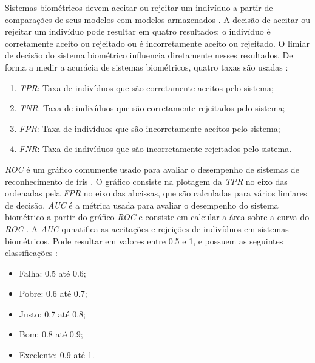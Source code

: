 \par Sistemas biométricos devem aceitar ou rejeitar um indivíduo a partir de comparações de seus modelos com modelos armazenados \cite{wayman2005biometric}. A decisão de aceitar ou rejeitar um indivíduo pode resultar em quatro resultados: o indivíduo é corretamente aceito ou rejeitado ou é incorretamente aceito ou rejeitado. O limiar de decisão do sistema biométrico influencia diretamente nesses resultados. De forma a medir a acurácia de sistemas biométricos, quatro taxas são usadas \cite{daugman2000}:

\begin{enumerate}
    \item \textit{\acrfull{TPR}}: Taxa de indivíduos que são corretamente aceitos pelo sistema;
    \item \textit{\acrfull{TNR}}: Taxa de indivíduos que são corretamente rejeitados pelo sistema;
    \item \textit{\acrfull{FPR}}: Taxa de indivíduos que são incorretamente aceitos pelo sistema;
    \item \textit{\acrfull{FNR}}: Taxa de indivíduos que são incorretamente rejeitados pelo sistema.
\end{enumerate}

\par \textit{\acrshort{ROC}} é um gráfico comumente usado para avaliar o desempenho de sistemas de reconhecimento de íris \cite{aucROC, daugman2000}. O gráfico consiste na plotagem da \textit{\acrshort{TPR}} no eixo das ordenadas pela \textit{\acrshort{FPR}} no eixo das abcissas, que são calculadas para vários limiares de decisão. \textit{\acrshort{AUC}} é a métrica usada para avaliar o desempenho do sistema biométrico a partir do gráfico \textit{\acrshort{ROC}} e consiste em calcular a área sobre a curva do \textit{\acrshort{ROC}} \cite{aucROC}. A \textit{\acrshort{AUC}} qunatifica as aceitações e rejeições de indivíduos em sistemas biométricos. Pode resultar em valores entre 0.5 e 1, e possuem as seguintes classificações \cite{aucROC}:

\begin{itemize}
    \item Falha: 0.5 até 0.6;
    \item Pobre: 0.6 até 0.7;
    \item Justo: 0.7 até 0.8;
    \item Bom: 0.8 até 0.9;
    \item Excelente: 0.9 até 1.
\end{itemize}

